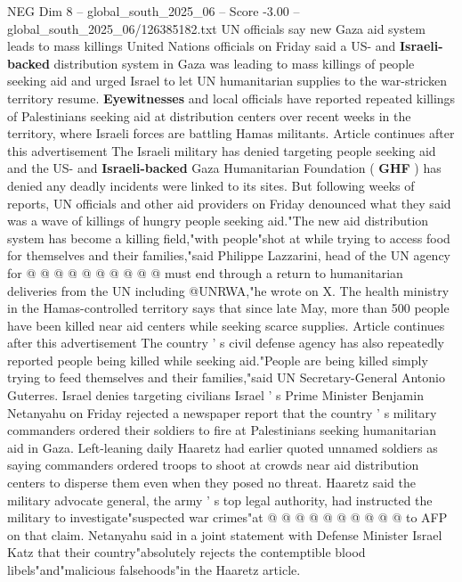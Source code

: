 \begin{textsample}{NEG Dim 8 – global\_south\_2025\_06 – Score -3.00 – global\_south\_2025\_06/126385182.txt}  \label{ex:f8_neg_036}
UN officials say new Gaza aid system leads to mass killings United Nations officials on Friday said a US- and \textbf{Israeli-backed} distribution system in Gaza was leading to mass killings of people seeking aid and urged Israel to let UN humanitarian supplies to the war-stricken territory resume. \textbf{Eyewitnesses} and local officials have reported repeated killings of Palestinians seeking aid at distribution centers over recent weeks in the territory, where Israeli forces are battling Hamas militants.
Article continues after this advertisement The Israeli military has denied targeting people seeking aid and the US- and \textbf{Israeli-backed} Gaza Humanitarian Foundation ( \textbf{GHF} ) has denied any deadly incidents were linked to its sites.
But following weeks of reports, UN officials and other aid providers on Friday denounced what they said was a wave of killings of hungry people seeking aid."The new aid distribution system has become a killing field,"with people"shot at while trying to access food for themselves and their families,"said Philippe Lazzarini, head of the UN agency for @ @ @ @ @ @ @ @ @ @ must end through a return to humanitarian deliveries from the UN including @UNRWA,"he wrote on X.
The health ministry in the Hamas-controlled territory says that since late May, more than 500 people have been killed near aid centers while seeking scarce supplies.
Article continues after this advertisement The country ' s civil defense agency has also repeatedly reported people being killed while seeking aid."People are being killed simply trying to feed themselves and their families,"said UN Secretary-General Antonio Guterres.
Israel denies targeting civilians Israel ' s Prime Minister Benjamin Netanyahu on Friday rejected a newspaper report that the country ' s military commanders ordered their soldiers to fire at Palestinians seeking humanitarian aid in Gaza.
Left-leaning daily Haaretz had earlier quoted unnamed soldiers as saying commanders ordered troops to shoot at crowds near aid distribution centers to disperse them even when they posed no threat.
Haaretz said the military advocate general, the army ' s top legal authority, had instructed the military to investigate"suspected war crimes"at @ @ @ @ @ @ @ @ @ @ to AFP on that claim.
Netanyahu said in a joint statement with Defense Minister Israel Katz that their country"absolutely rejects the contemptible blood libels"and"malicious falsehoods"in the Haaretz article.

\end{textsample}
